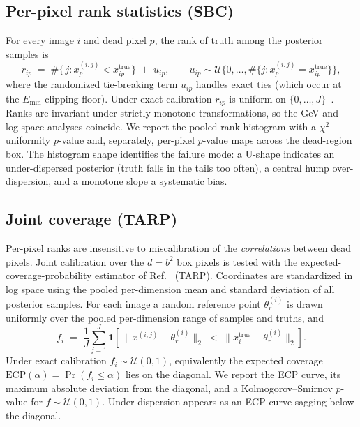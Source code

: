 \subsection{Per-pixel rank statistics (SBC)}
\label{sec:validation:sbc}

For every image $i$ and dead pixel $p$, the rank of truth among the
posterior samples is
\begin{equation}
  r_{ip} \;=\; \#\bigl\{\, j : x^{(i,j)}_p < x^{\mathrm{true}}_{ip} \bigr\}
  \;+\; u_{ip},
  \qquad
  u_{ip} \sim \mathcal{U}\bigl\{0, \dots,
      \#\{ j : x^{(i,j)}_p = x^{\mathrm{true}}_{ip}\}\bigr\},
  \label{eq:sbc-rank}
\end{equation}
where the randomized tie-breaking term $u_{ip}$ handles exact ties
(which occur at the $E_{\min}$ clipping floor).  Under exact calibration
$r_{ip}$ is uniform on $\{0, \dots, J\}$~\cite{talts2018sbc}.  Ranks are
invariant under strictly monotone transformations, so the GeV and
log-space analyses coincide.  We report the pooled rank histogram with a
$\chi^2$ uniformity $p$-value and, separately, per-pixel $p$-value maps
across the dead-region box.  The histogram shape identifies the failure
mode: a U-shape indicates an under-dispersed posterior (truth falls in
the tails too often), a central hump over-dispersion, and a monotone
slope a systematic bias.

\subsection{Joint coverage (TARP)}
\label{sec:validation:tarp}

Per-pixel ranks are insensitive to miscalibration of the
\emph{correlations} between dead pixels.  Joint calibration over the
$d = b^2$ box pixels is tested with the expected-coverage-probability
estimator of Ref.~\cite{lemos2023tarp} (TARP).  Coordinates are
standardized in log space using the pooled per-dimension mean and
standard deviation of all posterior samples.  For each image a random
reference point $\theta^{(i)}_r$ is drawn uniformly over the pooled
per-dimension range of samples and truths, and
\begin{equation}
  f_i \;=\; \frac{1}{J} \sum_{j=1}^{J}
    \mathbf{1}\!\left[\,
      \bigl\lVert x^{(i,j)} - \theta^{(i)}_r \bigr\rVert_2
      \;<\;
      \bigl\lVert x^{\mathrm{true}}_{i} - \theta^{(i)}_r \bigr\rVert_2
    \right].
  \label{eq:tarp-f}
\end{equation}
Under exact calibration $f_i \sim \mathcal{U}(0,1)$, equivalently the
expected coverage $\mathrm{ECP}(\alpha) = \Pr(f_i \le \alpha)$ lies on
the diagonal.  We report the ECP curve, its maximum absolute deviation
from the diagonal, and a Kolmogorov--Smirnov $p$-value for
$f \sim \mathcal{U}(0,1)$.  Under-dispersion appears as an ECP curve
sagging below the diagonal.

